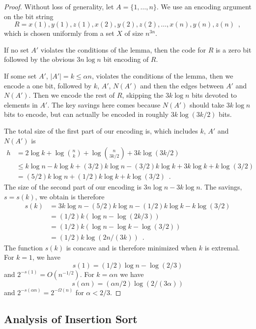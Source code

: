 \documentclass[lotsofwhite]{patmorin}
\begin{document}
\begin{proof}
Without loss of generality, let $A=\{1,\ldots,n\}$.  We use an encoding argument on the bit string
\[
   R = x(1), y(1), z(1), x(2), y(2), z(2), \ldots, x(n), y(n), z(n) \enspace ,
\]
which is chosen uniformly from a set $X$ of size $n^{3n}$.

If no set $A'$ violates the conditions of the lemma, then the code for
$R$ is a zero bit followed by the obvious $3n\log n$ bit encoding of $R$.

If some set $A'$, $|A'|=k\le \alpha n$, violates the conditions of the
lemma, then we encode a one bit, followed by $k$, $A'$, $N(A')$ and
then the edges between $A'$ and $N(A')$.  Then we encode the rest of
$R$, skipping the $3k\log n$ bits devoted to elements in $A'$.  The key
savings here comes because $N(A')$ should take $3k\log n$ bits to encode,
but can actually be encoded in roughly $3k\log(3k/2)$ bits.

The total size of the first part of our encoding is, which includes $k$,
$A'$ and $N(A')$ is
\begin{align*}
    h & = 2\log k + \log\binom{n}{k} + \log\binom{n}{3k/2} + 3k\log (3k/2) \\
       & \le k\log n - k\log k + (3/2)k\log n - (3/2)k\log k + 3k\log k + k\log(3/2) \\
      & = (5/2)k\log n + (1/2)k\log k + k\log(3/2)  \enspace .
\end{align*}
The size of the second part of our encoding is $3n\log n - 3k\log n$.  The savings, $s=s(k)$, we obtain is therefore
\begin{align*}
     s(k) & = 3k\log n - (5/2)k\log n - (1/2)k\log k - k\log(3/2) \\
       & = (1/2)k(\log n - \log(2k/3)) \\
       & = (1/2)k(\log n - \log k - \log(3/2)) \\
       & = (1/2)k\log(2n/(3k)) \enspace .
\end{align*}
The function $s(k)$ is concave and is therefore minimized when $k$ is extremal. For $k=1$, we have 
\[
    s(1)=(1/2)\log n - \log(2/3)
\]
and $2^{-s(1)} = O(n^{-1/2})$.  For $k=\alpha n$ we have
\[
   s(\alpha n) = (\alpha n/2)\log(2/(3\alpha))
\]
and $2^{-s(\alpha n)} = 2^{-\Omega(n)}$ for $\alpha < 2/3$.
\end{proof}


\subsection{Analysis of Insertion Sort}
\end{document}
